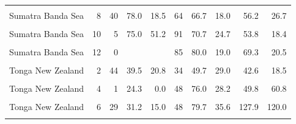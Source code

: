\begin{ThreePartTable}
\begin{longtable}[t]{lrrrrrrrrr}
\cellcolor{gray!6}{Sumatra Banda Sea} & \cellcolor{gray!6}{7} & \cellcolor{gray!6}{86} & \cellcolor{gray!6}{70.5} & \cellcolor{gray!6}{31.5} & \cellcolor{gray!6}{72} & \cellcolor{gray!6}{71.7} & \cellcolor{gray!6}{24.7} & \cellcolor{gray!6}{71.7} & \cellcolor{gray!6}{30.0}\\
Sumatra Banda Sea & 8 & 40 & 78.0 & 18.5 & 64 & 66.7 & 18.0 & 56.2 & 26.7\\
\cellcolor{gray!6}{Sumatra Banda Sea} & \cellcolor{gray!6}{9} & \cellcolor{gray!6}{30} & \cellcolor{gray!6}{77.5} & \cellcolor{gray!6}{25.2} & \cellcolor{gray!6}{83} & \cellcolor{gray!6}{68.8} & \cellcolor{gray!6}{28.8} & \cellcolor{gray!6}{42.5} & \cellcolor{gray!6}{39.1}\\
Sumatra Banda Sea & 10 & 5 & 75.0 & 51.2 & 91 & 70.7 & 24.7 & 53.8 & 18.4\\
\cellcolor{gray!6}{Sumatra Banda Sea} & \cellcolor{gray!6}{11} & \cellcolor{gray!6}{1} & \cellcolor{gray!6}{71.2} & \cellcolor{gray!6}{0.0} & \cellcolor{gray!6}{67} & \cellcolor{gray!6}{72.3} & \cellcolor{gray!6}{12.4} & \cellcolor{gray!6}{62.4} & \cellcolor{gray!6}{7.5}\\
Sumatra Banda Sea & 12 & 0 &  &  & 85 & 80.0 & 19.0 & 69.3 & 20.5\\
\cellcolor{gray!6}{Tonga New Zealand} & \cellcolor{gray!6}{1} & \cellcolor{gray!6}{75} & \cellcolor{gray!6}{47.0} & \cellcolor{gray!6}{39.0} & \cellcolor{gray!6}{44} & \cellcolor{gray!6}{56.9} & \cellcolor{gray!6}{24.3} & \cellcolor{gray!6}{47.9} & \cellcolor{gray!6}{21.1}\\
Tonga New Zealand & 2 & 44 & 39.5 & 20.8 & 34 & 49.7 & 29.0 & 42.6 & 18.5\\
\cellcolor{gray!6}{Tonga New Zealand} & \cellcolor{gray!6}{3} & \cellcolor{gray!6}{30} & \cellcolor{gray!6}{64.0} & \cellcolor{gray!6}{36.0} & \cellcolor{gray!6}{64} & \cellcolor{gray!6}{73.6} & \cellcolor{gray!6}{38.2} & \cellcolor{gray!6}{95.3} & \cellcolor{gray!6}{90.0}\\
Tonga New Zealand & 4 & 1 & 24.3 & 0.0 & 48 & 76.0 & 28.2 & 49.8 & 60.8\\
\cellcolor{gray!6}{Tonga New Zealand} & \cellcolor{gray!6}{5} & \cellcolor{gray!6}{1} & \cellcolor{gray!6}{15.1} & \cellcolor{gray!6}{0.0} & \cellcolor{gray!6}{68} & \cellcolor{gray!6}{80.7} & \cellcolor{gray!6}{37.4} & \cellcolor{gray!6}{40.5} & \cellcolor{gray!6}{51.2}\\
Tonga New Zealand & 6 & 29 & 31.2 & 15.0 & 48 & 79.7 & 35.6 & 127.9 & 120.0\\
\cellcolor{gray!6}{Tonga New Zealand} & \cellcolor{gray!6}{7} & \cellcolor{gray!6}{35} & \cellcolor{gray!6}{28.5} & \cellcolor{gray!6}{7.1} & \cellcolor{gray!6}{53} & \cellcolor{gray!6}{71.9} & \cellcolor{gray!6}{24.0} & \cellcolor{gray!6}{47.4} & \cellcolor{gray!6}{32.0}\\

\end{longtable}
\end{ThreePartTable}
